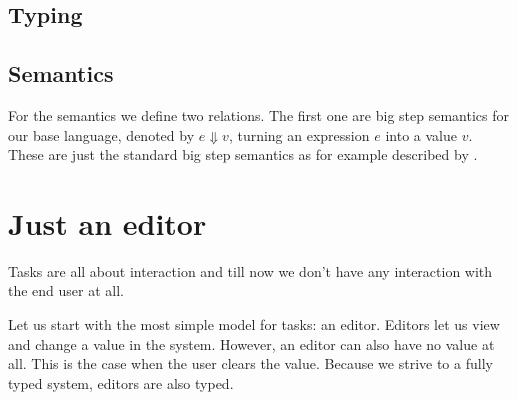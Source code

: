 \subsection{Typing}



\subsection{Semantics}

For the semantics we define two relations.
The first one are big step semantics for our base language,
denoted by $e \Downarrow v$, turning an expression $e$ into a value $v$.
These are just the standard big step semantics as for example described by \textcite{Pierce:2002tp}.


\section{Just an editor}

Tasks are all about interaction and till now we don't have any interaction with the end user at all.

Let us start with the most simple model for tasks: an editor.
Editors let us view and change a value in the system.
However, an editor can also have no value at all.
This is the case when the user clears the value.
Because we strive to a fully typed system, editors are also typed.
